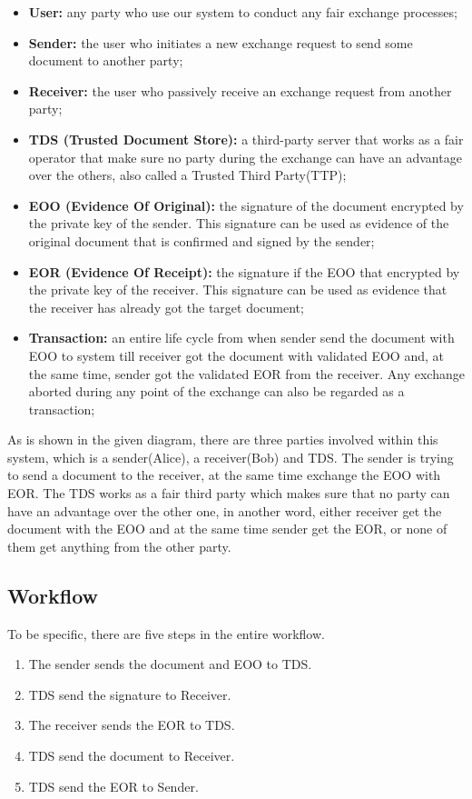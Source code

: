 \documentclass[runningheads]{llncs}
\begin{document}
\begin{itemize}
	\item \textbf{User:} any party who use our system to conduct any fair exchange processes;
	\item \textbf{Sender:} the user who initiates a new exchange request to send some document to another party;
	\item \textbf{Receiver:} the user who passively receive an exchange request from another party;
	\item \textbf{TDS (Trusted Document Store):} a third-party server that works as a fair operator that make sure no party during the exchange can have an advantage over the others, also called a Trusted Third Party(TTP);
	\item \textbf{EOO (Evidence Of Original):} the signature of the document encrypted by the private key of the sender. This signature can be used as evidence of the original document that is confirmed and signed by the sender;
	\item \textbf{EOR (Evidence Of Receipt):} the signature if the EOO that encrypted by the private key of the receiver. This signature can be used as evidence that the receiver has already got the target document;
	\item \textbf{Transaction:} an entire life cycle from when sender send the document with EOO to system till receiver got the document with validated EOO and, at the same time, sender got the validated EOR from the receiver. Any exchange aborted during any point of the exchange can also be regarded as a transaction;
\end{itemize}

As is shown in the given diagram, there are three parties involved within this system, which is a sender(Alice), a receiver(Bob) and TDS. The sender is trying to send a document to the receiver, at the same time exchange the EOO with EOR. The TDS works as a fair third party which makes sure that no party can have an advantage over the other one, in another word, either receiver get the document with the EOO and at the same time sender get the EOR, or none of them get anything from the other party. 

\subsection{Workflow}
To be specific, there are five steps in the entire workflow.

\begin{enumerate}
	\item The sender sends the document and EOO to TDS.
	\item TDS send the signature to Receiver.
	\item The receiver sends the EOR to TDS.
	\item TDS send the document to Receiver.
	\item TDS send the EOR to Sender.
\end{enumerate}
\end{document}
